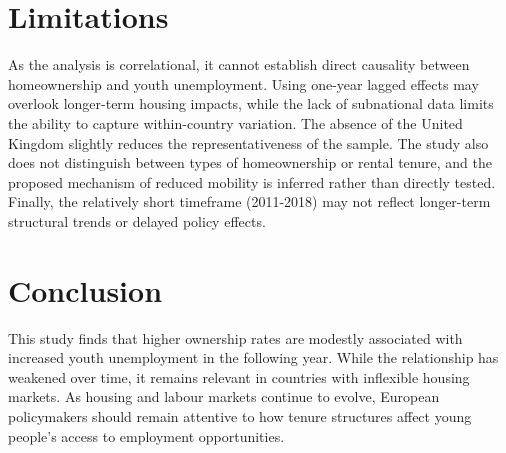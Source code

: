 \documentclass[11pt]{article}
\begin{document}
\begin{multicols}{2}
		\vspace{-1em}
		
		\section*{Limitations}
		As the analysis is correlational, it cannot establish direct causality between homeownership and youth unemployment. Using one-year lagged effects may overlook longer-term housing impacts, while the lack of subnational data limits the ability to capture within-country variation. The absence of the United Kingdom slightly reduces the representativeness of the sample. The study also does not distinguish between types of homeownership or rental tenure, and the proposed mechanism of reduced mobility is inferred rather than directly tested. Finally, the relatively short timeframe (2011-2018) may not reflect longer-term structural trends or delayed policy effects.

		\vspace{-1em}
		
		\section*{Conclusion}
		This study finds that higher ownership rates are modestly associated with increased youth unemployment in the following year. While the relationship has weakened over time, it remains relevant in countries with inflexible housing markets. As housing and labour markets continue to evolve, European policymakers should remain attentive to how tenure structures affect young people's access to employment opportunities.
		
	\end{multicols}
\end{document}

